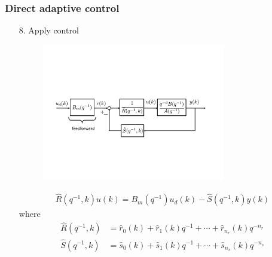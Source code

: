 \begin{frame}
    \frametitle{Direct adaptive control}

    \begin{enumerate}
        \item[8.]
        Apply control
        \begin{figure}[h]
            \centering
            \includegraphics[width=8cm]{figs_control}\\
        \end{figure}
        \begin{align*}
            \hat{R}(q^{-1},k) u(k) = B_m(q^{-1}) u_d(k) - \hat{S}(q^{-1},k) y(k)
        \end{align*}
        where
        \begin{align*}
            \hat{R}(q^{-1},k) & = \hat{r}_0(k) + \hat{r}_1(k) q^{-1} + \cdots + \hat{r}_{n_r}(k) q^{-n_r} \\
            \hat{S}(q^{-1},k) & = \hat{s}_0(k) + \hat{s}_1(k) q^{-1} + \cdots + \hat{s}_{n_s}(k) q^{-n_s}
        \end{align*}

    \end{enumerate}
\end{frame}




